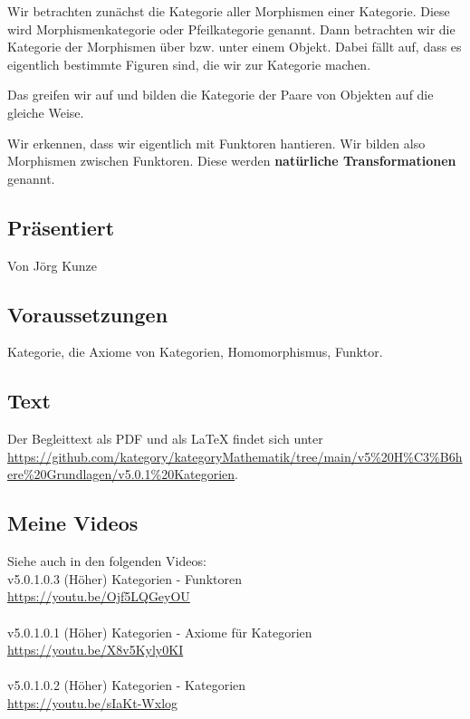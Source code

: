 \documentclass[a4paper]{amsart}
\theoremstyle{definition}
\begin{document}
Wir betrachten zunächst die Kategorie aller Morphismen einer Kategorie. Diese wird Morphismenkategorie oder Pfeilkategorie genannt. Dann betrachten wir die Kategorie der Morphismen über bzw. unter einem Objekt. Dabei fällt auf, dass es eigentlich bestimmte Figuren sind, die wir zur Kategorie machen.

Das greifen wir auf und bilden die Kategorie der Paare von Objekten auf die gleiche Weise. 

Wir erkennen, dass wir eigentlich mit Funktoren hantieren. Wir bilden also Morphismen zwischen Funktoren. Diese werden \textbf{natürliche Transformationen} genannt.

\subsection*{Präsentiert}
Von Jörg Kunze

\subsection*{Voraussetzungen}
Kategorie, die Axiome von Kategorien, Homomorphismus, Funktor.

\subsection*{Text}
Der Begleittext als PDF und als LaTeX findet sich unter
\url{https://github.com/kategory/kategoryMathematik/tree/main/v5%20H%C3%B6here%20Grundlagen/v5.0.1%20Kategorien}.

\subsection*{Meine Videos}
Siehe auch in den folgenden Videos:\\
v5.0.1.0.3 (Höher) Kategorien - Funktoren\\
\url{https://youtu.be/Ojf5LQGeyOU}\\
\\
v5.0.1.0.1 (Höher) Kategorien - Axiome für Kategorien\\
 \url{https://youtu.be/X8v5Kyly0KI}\\
 \\
v5.0.1.0.2 (Höher) Kategorien - Kategorien\\
 \url{https://youtu.be/sIaKt-Wxlog}
\end{document}
